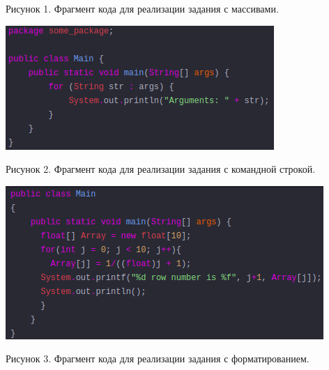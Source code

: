 \documentclass{article}
\begin{document}
\caption{Рисунок 1. Фрагмент кода для реализации задания с массивами.}

\includegraphics[width=0.9\linewidth]{view2.png}

\caption{Рисунок 2. Фрагмент кода для реализации задания с командной строкой.}

\includegraphics[width=0.9\linewidth]{view3.png}

\caption{Рисунок 3. Фрагмент кода для реализации задания с форматированием.}
\end{document}
